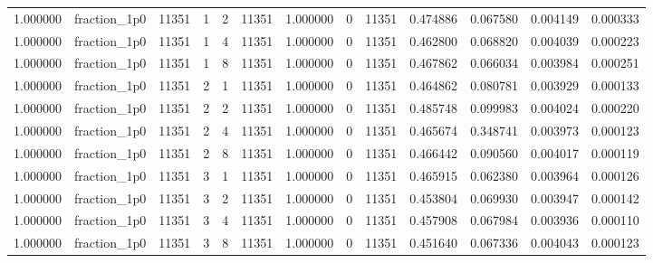 \begin{tabular}{rlrrrrrrrrrrr}
1.000000 & fraction\_1p0 & 11351 & 1 & 2 & 11351 & 1.000000 & 0 & 11351 & 0.474886 & 0.067580 & 0.004149 & 0.000333 \\
1.000000 & fraction\_1p0 & 11351 & 1 & 4 & 11351 & 1.000000 & 0 & 11351 & 0.462800 & 0.068820 & 0.004039 & 0.000223 \\
1.000000 & fraction\_1p0 & 11351 & 1 & 8 & 11351 & 1.000000 & 0 & 11351 & 0.467862 & 0.066034 & 0.003984 & 0.000251 \\
1.000000 & fraction\_1p0 & 11351 & 2 & 1 & 11351 & 1.000000 & 0 & 11351 & 0.464862 & 0.080781 & 0.003929 & 0.000133 \\
1.000000 & fraction\_1p0 & 11351 & 2 & 2 & 11351 & 1.000000 & 0 & 11351 & 0.485748 & 0.099983 & 0.004024 & 0.000220 \\
1.000000 & fraction\_1p0 & 11351 & 2 & 4 & 11351 & 1.000000 & 0 & 11351 & 0.465674 & 0.348741 & 0.003973 & 0.000123 \\
1.000000 & fraction\_1p0 & 11351 & 2 & 8 & 11351 & 1.000000 & 0 & 11351 & 0.466442 & 0.090560 & 0.004017 & 0.000119 \\
1.000000 & fraction\_1p0 & 11351 & 3 & 1 & 11351 & 1.000000 & 0 & 11351 & 0.465915 & 0.062380 & 0.003964 & 0.000126 \\
1.000000 & fraction\_1p0 & 11351 & 3 & 2 & 11351 & 1.000000 & 0 & 11351 & 0.453804 & 0.069930 & 0.003947 & 0.000142 \\
1.000000 & fraction\_1p0 & 11351 & 3 & 4 & 11351 & 1.000000 & 0 & 11351 & 0.457908 & 0.067984 & 0.003936 & 0.000110 \\
1.000000 & fraction\_1p0 & 11351 & 3 & 8 & 11351 & 1.000000 & 0 & 11351 & 0.451640 & 0.067336 & 0.004043 & 0.000123 \\
\bottomrule
\end{tabular}
